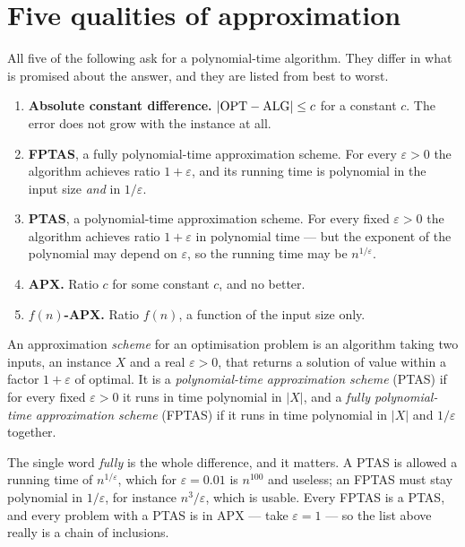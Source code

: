 \section{Five qualities of approximation}
\label{sec:approx-qualities}

All five of the following ask for a polynomial-time algorithm. They differ in
what is promised about the answer, and they are listed from best to worst.

\begin{enumerate}[leftmargin=*,label=\arabic*.]
  \item \textbf{Absolute constant difference.}
        $|\mathrm{OPT} - \mathrm{ALG}| \le c$ for a constant $c$. The error does not
        grow with the instance at all.
  \item \textbf{FPTAS}, a fully polynomial-time approximation scheme. For every
        $\varepsilon > 0$ the algorithm achieves ratio $1+\varepsilon$, and its
        running time is polynomial in the input size \emph{and} in
        $1/\varepsilon$.
  \item \textbf{PTAS}, a polynomial-time approximation scheme. For every fixed
        $\varepsilon > 0$ the algorithm achieves ratio $1+\varepsilon$ in
        polynomial time --- but the exponent of the polynomial may depend on
        $\varepsilon$, so the running time may be $n^{1/\varepsilon}$.
  \item \textbf{APX.} Ratio $c$ for some constant $c$, and no better.
  \item \textbf{$f(n)$-APX.} Ratio $f(n)$, a function of the input size only.
\end{enumerate}

\begin{definition}\label{def:ptas-fptas}
An approximation \emph{scheme} for an optimisation problem is an algorithm
taking two inputs, an instance $X$ and a real $\varepsilon > 0$, that returns a
solution of value within a factor $1+\varepsilon$ of optimal. It is a
\emph{polynomial-time approximation scheme} (PTAS) if for every fixed
$\varepsilon > 0$ it runs in time polynomial in $|X|$, and a \emph{fully
polynomial-time approximation scheme} (FPTAS) if it runs in time polynomial in
$|X|$ and $1/\varepsilon$ together.
\end{definition}

The single word \emph{fully} is the whole difference, and it matters. A PTAS is
allowed a running time of $n^{1/\varepsilon}$, which for $\varepsilon = 0.01$ is
$n^{100}$ and useless; an FPTAS must stay polynomial in $1/\varepsilon$, for
instance $n^3/\varepsilon$, which is usable. Every FPTAS is a PTAS, and every
problem with a PTAS is in \textrm{APX} --- take $\varepsilon = 1$ --- so the
list above really is a chain of inclusions.

